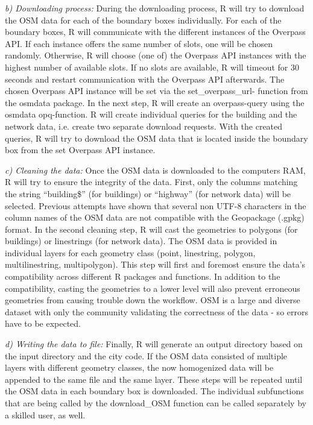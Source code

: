 \documentclass[10pt]{article}
\begin{document}
\textit{b) Downloading process:} During the downloading process, R will try to download the OSM data for each of the boundary boxes individually.
For each of the boundary boxes, R will communicate with the different instances of the Overpass API.
If each instance offers the same number of slots, one will be chosen randomly.
Otherwise, R will choose (one of) the Overpass API instances with the highest number of available slots.
If no slots are available, R will timeout for 30 seconds and restart communication with the Overpass API afterwards.
The chosen Overpass API instance will be set via the set\_overpass\_url- function from the osmdata package.
In the next step, R will create an overpass-query using the osmdata opq-function.
R will create individual queries for the building and the network data, i.e. create two separate download requests.
With the created queries, R will try to download the OSM data that is located inside the boundary box from the set Overpass API instance.

\textit{c) Cleaning the data:} Once the OSM data is downloaded to the computers RAM, R will try to ensure the integrity of the data.
First, only the columns matching the string “building\$” (for buildings) or “highway” (for network data) will be selected. 
Previous attempts have shown that several non UTF-8 characters in the column names of the OSM data are not compatible with the Geopackage (.gpkg) format.
In the second cleaning step, R will cast the geometries to polygons (for buildings) or linestrings (for network data).
The OSM data is provided in individual layers for each geometry class (point, linestring, polygon, multilinestring, multipolygon).
This step will first and foremost ensure the data’s compatibility across different R packages and functions.
In addition to the compatibility, casting the geometries to a lower level will also prevent erroneous geometries from causing trouble down the workflow.
OSM is a large and diverse dataset with only the community validating the correctness of the data - so errors have to be expected.

\textit{d) Writing the data to file:} Finally, R will generate an output directory based on the input directory and the city code.
If the OSM data consisted of multiple layers with different geometry classes, the now homogenized data will be appended to the same file and the same layer.
These steps will be repeated until the OSM data in each boundary box is downloaded.
The individual subfunctions that are being called by the download\_OSM function can be called separately by a skilled user, as well. 
\end{document}
